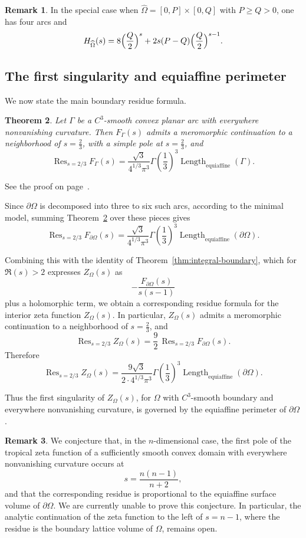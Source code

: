 \documentclass[a4paper,american,11pt]{amsart}
\theoremstyle{plain}
\newtheorem{theorem}{Theorem}[section]
\theoremstyle{definition}
\newtheorem{remark}[theorem]{Remark}
\DeclareMathOperator*{\Res}{Res}
\DeclareMathOperator{\Length}{Length}
\begin{document}
\begin{remark}
In the special case when \(\widehat\Omega=[0,P]\times[0,Q]\) with
\(P\ge Q>0\), one has four arcs and
\[
H_{\widehat\Omega}(s)
=
8\Bigl(\frac Q2\Bigr)^s
+
2s(P-Q)\Bigl(\frac Q2\Bigr)^{s-1}.
\]
\end{remark}

\subsection{The first singularity and equiaffine perimeter}

We now state the main boundary residue formula.

\begin{theorem}\label{thm:boundary-residue}
Let \(\Gamma\) be a \(C^3\)-smooth convex planar arc with everywhere nonvanishing
curvature. Then \(F_\Gamma(s)\) admits a meromorphic continuation to a
neighborhood of \(s=\frac23\), with a simple pole at \(s=\frac23\), and
\[
\Res_{s=2/3}F_\Gamma(s)
=
\frac{\sqrt3}{4^{1/3}\pi^3}\Gamma\!\left(\frac13\right)^3
\Length_{\mathrm{equiaffine}}(\Gamma).
\]
\end{theorem}

See the proof on page~\pageref{proof:thm:boundary-residue}.

Since \(\partial\Omega\) is decomposed into three to six such arcs, according
to the minimal model, summing Theorem~\ref{thm:boundary-residue} over these
pieces gives
\[
\Res_{s=2/3}F_{\partial\Omega}(s)
=
\frac{\sqrt3}{4^{1/3}\pi^3}\Gamma\!\left(\frac13\right)^3
\Length_{\mathrm{equiaffine}}(\partial\Omega).
\]

Combining this with the identity of Theorem~\ref{thm:integral-boundary},
which for \(\Re(s)>2\) expresses \(Z_\Omega(s)\) as
\[
-\frac{F_{\partial\Omega}(s)}{s(s-1)}
\]
plus a holomorphic term, we obtain a corresponding residue formula for the
interior zeta function \(Z_\Omega(s)\). In particular, \(Z_\Omega(s)\) admits
a meromorphic continuation to a neighborhood of \(s=\frac23\), and
\[
\Res_{s=2/3}Z_\Omega(s)
=
\frac92\,\Res_{s=2/3}F_{\partial\Omega}(s).
\]
Therefore
\[
\Res_{s=2/3}Z_\Omega(s)
=
\frac{9\sqrt3}{2\cdot 4^{1/3}\pi^3}
\Gamma\!\left(\frac13\right)^3
\Length_{\mathrm{equiaffine}}(\partial\Omega).
\]

Thus the first singularity of \(Z_\Omega(s)\), for \(\Omega\) with \(C^3\)-smooth
boundary and everywhere nonvanishing curvature, is governed by the equiaffine
perimeter of \(\partial\Omega\).

\begin{remark}
We conjecture that, in the \(n\)-dimensional case, the first pole of the
tropical zeta function of a sufficiently smooth convex domain with everywhere
nonvanishing curvature occurs at
\[
s=\frac{n(n-1)}{n+2},
\]
and that the corresponding residue is proportional to the equiaffine surface
volume of \(\partial\Omega\). We are currently unable to prove this conjecture.
In particular, the analytic continuation of the zeta function to the left of
\(s=n-1\), where the residue is the boundary lattice volume of \(\Omega\),
remains open.
\end{remark}
\end{document}
